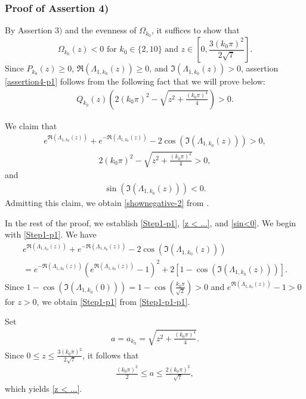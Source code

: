\documentclass[11pt, reqno]{amsart}
\theoremstyle{plain}
\numberwithin{equation}{section}
\newcommand{\be}{\begin{equation}}
\newcommand{\ee}{\end{equation}}
\begin{document}
\subsubsection{Proof of Assertion 4)}
By Assertion $3)$ and the evenness of $\Omega_{k_0}$, it suffices to show that
\be \label{assertion4-p1}
\Omega_{k_0}(z) < 0 \mbox{ for } k_0 \in \{2, 10\} \text{ and } z \in \left[0, \frac{3(k_0 \pi)^2}{2 \sqrt{7}}\right]. 
\ee
Since $P_{k_0}(z)\geq 0$, $\Re (\Lambda_{1,k_0}(z)) \geq 0$, and $\Im(\Lambda_{1, k_0}(z)) > 0$, assertion \eqref{assertion4-p1} follows from the following fact that we will prove below:
\begin{align}
 \label{shownegative-2}
         Q_{k_0}(z)  \left(2(k_0 \pi)^2 - \sqrt{z^2 + \frac{(k_0 \pi)^4}{4}} \right)  > 0.
\end{align} 

We claim that
\begin{align}
 e^{\Re (\Lambda_{1,k_0}(z))} + e^{-\Re (\Lambda_{1,k_0}(z))} - 2 \cos (\Im (\Lambda_{1,k_0}(z)) ) > 0, \label{Step1-p1}
\end{align}
 \begin{align}   \label{z < ...}
        2({k_0} \pi)^2 - \sqrt{z^2 + \frac{({k_0} \pi)^4}{4} } > 0,
    \end{align} 
    and
     \begin{align}   \label{sin<0}
        \sin (\Im (\Lambda_{1,k_0}(z))) < 0. 
    \end{align} 
Admitting this claim, we obtain \eqref{shownegative-2} from . 

In the rest of the proof, we establish \eqref{Step1-p1}, \eqref{z < ...}, and \eqref{sin<0}. We begin with \eqref{Step1-p1}. We have
\begin{multline}\label{Step1-p1-p1}
e^{\Re(\Lambda_{1,k_0}(z))} + e^{- \Re(\Lambda_{1,k_0}(z))} - 2 \cos (\Im (\Lambda_{1,k_0}(z)) )  \\
  = e^{-\Re(\Lambda_{1,k_0}(z))} \left(e^{\Re(\Lambda_{1,k_0}(z))} - 1 \right)^2 + 2 \left[ 1 -  \cos(\Im (\Lambda_{1,k_0}(z))) \right].
\end{multline}
Since $1 - \cos(\Im(\Lambda_{1,k_0}(0))) = 1 - \cos(\frac{{k_0} \pi}{\sqrt{2}}) > 0$ and $e^{\Re(\Lambda_{1,k_0}(z))} - 1 > 0$ for $z > 0$, we obtain \eqref{Step1-p1} from \eqref{Step1-p1-p1}. 


Set
\begin{align}
a = a_{k_0} = \sqrt{z^2 + \frac{(k_0 \pi)^4}{4}}.
\end{align}
Since $ 0  \leq z \leq \frac{3({k_0} \pi)^2}{2 \sqrt{7}}$, it follows that
\begin{align}	\label{rangea}
			 	\frac{({k_0} \pi)^2}{2} \leq a \leq \frac{2({k_0} \pi)^2}{\sqrt{7}}, 
\end{align}
which yields \eqref{z < ...}.   
\end{document}

